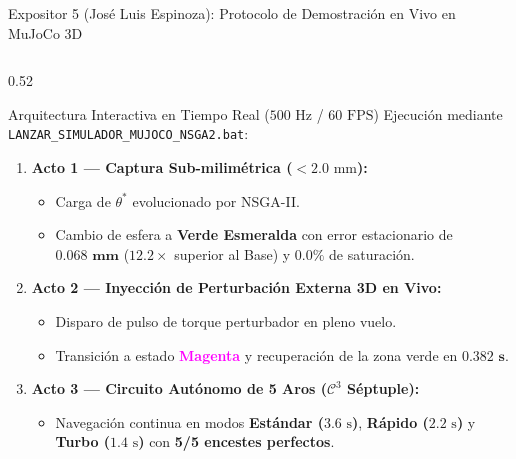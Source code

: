 \documentclass[aspectratio=169,10pt]{beamer}
\begin{document}
\begin{frame}{Expositor 5 (José Luis Espinoza): Protocolo de Demostración en Vivo en MuJoCo 3D}
\begin{columns}[T,onlytextwidth]
\begin{column}{0.52\textwidth}
    \begin{block}{Arquitectura Interactiva en Tiempo Real ($500\text{ Hz}$ / $60\text{ FPS}$)}
        Ejecución mediante \texttt{LANZAR\_SIMULADOR\_MUJOCO\_NSGA2.bat}:
        \begin{enumerate}
            \item \textbf{Acto 1 — Captura Sub-milimétrica ($<2.0\text{ mm}$):}
            \begin{itemize}
                \item Carga de $\theta^*$ evolucionado por NSGA-II.
                \item Cambio de esfera a \textcolor{unigreen}{\textbf{Verde Esmeralda}} con error estacionario de $\mathbf{0.068\text{ mm}}$ ($12.2\times$ superior al Base) y $0.0\%$ de saturación.
            \end{itemize}
            \item \textbf{Acto 2 — Inyección de Perturbación Externa 3D en Vivo:}
            \begin{itemize}
                \item Disparo de pulso de torque perturbador en pleno vuelo.
                \item Transición a estado \textcolor{magenta}{\textbf{Magenta}} y recuperación de la zona verde en $\mathbf{0.382\text{ s}}$.
            \end{itemize}
            \item \textbf{Acto 3 — Circuito Autónomo de 5 Aros ($\mathcal{C}^3$ Séptuple):}
            \begin{itemize}
                \item Navegación continua en modos \textbf{Estándar ($3.6\text{ s}$)}, \textbf{Rápido ($2.2\text{ s}$)} y \textbf{Turbo ($1.4\text{ s}$)} con \textbf{5/5 encestes perfectos}.
            \end{itemize}
        \end{enumerate}
    \end{block}

\end{column}
\end{columns}
\end{frame}
\end{document}
